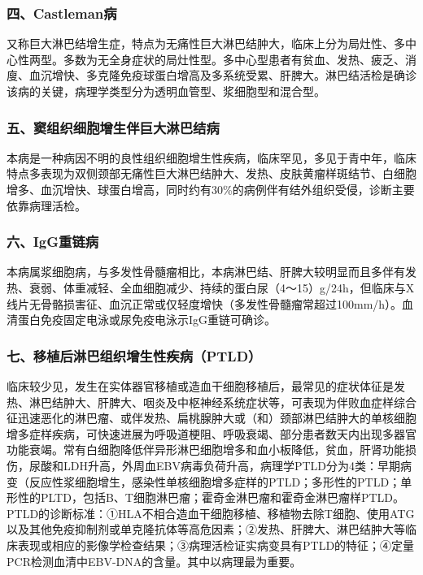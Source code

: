\subsubsection{四、Castleman病}

又称巨大淋巴结增生症，特点为无痛性巨大淋巴结肿大，临床上分为局灶性、多中心性两型。多数为无全身症状的局灶性型。多中心型患者有贫血、发热、疲乏、消廋、血沉增快、多克隆免疫球蛋白增高及多系统受累、肝脾大。淋巴结活检是确诊该病的关键，病理学类型分为透明血管型、浆细胞型和混合型。

\subsubsection{五、窦组织细胞增生伴巨大淋巴结病}

本病是一种病因不明的良性组织细胞增生性疾病，临床罕见，多见于青中年，临床特点多表现为双侧颈部无痛性巨大淋巴结肿大、发热、皮肤黄瘤样斑结节、白细胞增多、血沉增快、球蛋白增高，同时约有30\%的病例伴有结外组织受侵，诊断主要依靠病理活检。

\subsubsection{六、IgG重链病}

本病属浆细胞病，与多发性骨髓瘤相比，本病淋巴结、肝脾大较明显而且多伴有发热、衰弱、体重减轻、全血细胞减少、持续的蛋白尿（4～15）g/24h，但临床与X线片无骨骼损害征、血沉正常或仅轻度增快（多发性骨髓瘤常超过100mm/h）。血清蛋白免疫固定电泳或尿免疫电泳示IgG重链可确诊。

\subsubsection{七、移植后淋巴组织增生性疾病（PTLD）}

临床较少见，发生在实体器官移植或造血干细胞移植后，最常见的症状体征是发热、淋巴结肿大、肝脾大、咽炎及中枢神经系统症状等，可表现为伴败血症样综合征迅速恶化的淋巴瘤、或伴发热、扁桃腺肿大或（和）颈部淋巴结肿大的单核细胞增多症样疾病，可快速进展为呼吸道梗阻、呼吸衰竭、部分患者数天内出现多器官功能衰竭。常有白细胞降低伴异形淋巴细胞增多和血小板降低，贫血，肝肾功能损伤，尿酸和LDH升高，外周血EBV病毒负荷升高，病理学PTLD分为4类：早期病变（反应性浆细胞增生，感染性单核细胞增多症样的PTLD；多形性的PTLD；单形性的PLTD，包括B、T细胞淋巴瘤；霍奇金淋巴瘤和霍奇金淋巴瘤样PTLD。PTLD的诊断标准：①HLA不相合造血干细胞移植、移植物去除T细胞、使用ATG以及其他免疫抑制剂或单克隆抗体等高危因素；②发热、肝脾大、淋巴结肿大等临床表现或相应的影像学检查结果；③病理活检证实病变具有PTLD的特征；④定量PCR检测血清中EBV-DNA的含量。其中以病理最为重要。

